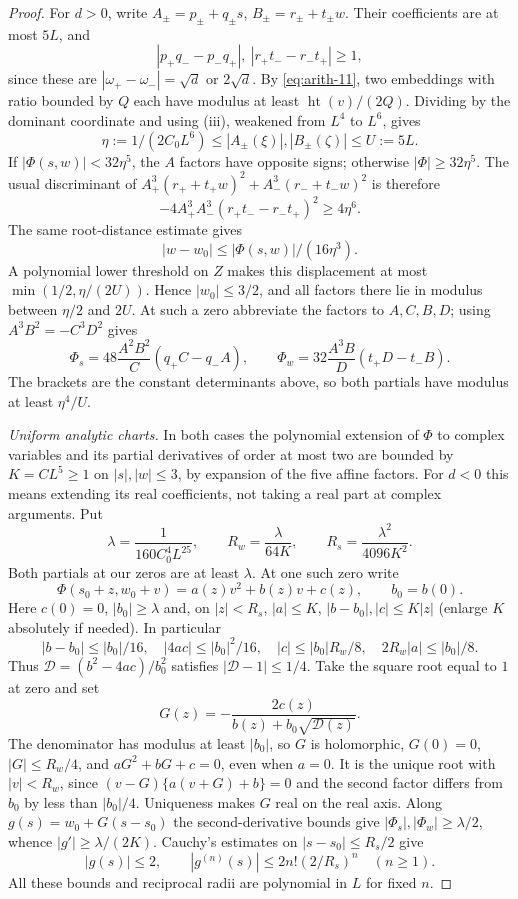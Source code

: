 \documentclass[11pt,reqno]{amsart}
\theoremstyle{definition}
\theoremstyle{remark}
\numberwithin{equation}{section}
\newcommand{\hgt}{\operatorname{ht}}
\begin{document}
\begin{proof}
For $d>0$, write $A_\pm=p_\pm+q_\pm s$,
$B_\pm=r_\pm+t_\pm w$. Their coefficients are at most $5L$, and
\[
 |p_+q_--p_-q_+|,\ |r_+t_--r_-t_+|\ge1,
\]
since these are $|\omega_+-\omega_-|=\sqrt d$ or $2\sqrt d$.
By \eqref{eq:arith-11}, two embeddings with ratio bounded by $Q$ each
have modulus at least $\hgt(v)/(2Q)$. Dividing by the dominant
coordinate and using (iii), weakened from $L^4$ to $L^6$, gives
\begin{equation}\label{eq:A3realfactors}
 \eta:=1/(2C_0L^6)\le|A_\pm(\xi)|,|B_\pm(\zeta)|\le U:=5L.
\end{equation}
If $|\Phi(s,w)|<32\eta^5$, the $A$ factors have opposite signs;
otherwise $|\Phi|\ge32\eta^5$. The usual discriminant of
$A_+^3(r_++t_+w)^2+A_-^3(r_-+t_-w)^2$ is therefore
\[
 -4A_+^3A_-^3(r_+t_--r_-t_+)^2\ge4\eta^6.
\]
The same root-distance estimate gives
\begin{equation}\label{eq:A3realclose}
 |w-w_0|\le|\Phi(s,w)|/(16\eta^3).
\end{equation}
A polynomial lower threshold on $Z$ makes this displacement at most
$\min(1/2,\eta/(2U))$. Hence $|w_0|\le3/2$, and all factors there
lie in modulus between $\eta/2$ and $2U$.
At such a zero abbreviate the factors to $A,C,B,D$; using
$A^3B^2=-C^3D^2$ gives
\[
 \Phi_s=48\frac{A^2B^2}{C}(q_+C-q_-A),\qquad
 \Phi_w=32\frac{A^3B}{D}(t_+D-t_-B).
\]
The brackets are the constant determinants above, so both partials
have modulus at least $\eta^4/U$.

\emph{Uniform analytic charts.}
In both cases the polynomial extension of $\Phi$ to complex variables
and its partial derivatives of order at most two are bounded by
$K=CL^5\ge1$ on $|s|,|w|\le3$, by expansion of the five affine factors.
For $d<0$ this means extending its real coefficients, not taking a real
part at complex arguments. Put
\[
 \lambda=\frac1{160C_0^4L^{25}},\qquad
 R_w=\frac\lambda{64K},\qquad R_s=\frac{\lambda^2}{4096K^2}.
\]
Both partials at our zeros are at least $\lambda$. At one such zero write
\[
 \Phi(s_0+z,w_0+v)=a(z)v^2+b(z)v+c(z),\qquad b_0=b(0).
\]
Here $c(0)=0$, $|b_0|\ge\lambda$ and, on $|z|<R_s$,
$|a|\le K$, $|b-b_0|,|c|\le K|z|$ (enlarge $K$ absolutely if needed).
In particular
\[
 |b-b_0|\le|b_0|/16,\quad |4ac|\le|b_0|^2/16,\quad
 |c|\le|b_0|R_w/8,\quad 2R_w|a|\le|b_0|/8.
\]
Thus $\mathcal D=(b^2-4ac)/b_0^2$ satisfies $|\mathcal D-1|\le1/4$.
Take the square root equal to $1$ at zero and set
\begin{equation}\label{eq:A3stablebranch}
 G(z)=-\frac{2c(z)}{b(z)+b_0\sqrt{\mathcal D(z)}}.
\end{equation}
The denominator has modulus at least $|b_0|$, so $G$ is holomorphic,
$G(0)=0$, $|G|\le R_w/4$, and $aG^2+bG+c=0$, even when $a=0$.
It is the unique root with $|v|<R_w$, since
$(v-G)\{a(v+G)+b\}=0$ and the second factor differs from $b_0$
by less than $|b_0|/4$. Uniqueness makes $G$ real on the real axis.
Along $g(s)=w_0+G(s-s_0)$ the second-derivative bounds give
$|\Phi_s|,|\Phi_w|\ge\lambda/2$, whence $|g'|\ge\lambda/(2K)$.
Cauchy's estimates on $|s-s_0|\le R_s/2$ give
\[
 |g(s)|\le2,\qquad |g^{(n)}(s)|\le2n!(2/R_s)^n\quad(n\ge1).
\]
All these bounds and reciprocal radii are polynomial in $L$ for fixed $n$.


\end{proof}
\end{document}
